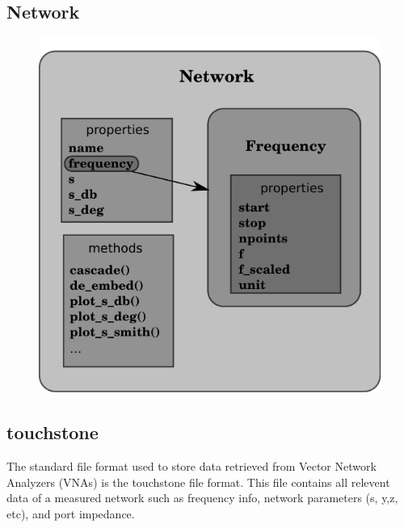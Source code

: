 \documentclass[letterpaper,10pt,english]{sphinxmanual}
\begin{document}
\subsection{Network}
\label{architecture:network}\begin{figure}[htbp]
\centering

\includegraphics{network.pdf}
\end{figure}


\subsection{touchstone}
\label{architecture:touchstone}
The standard file format used to store data retrieved from Vector Network Analyzers (VNAs) is the touchstone file format. This file contains all relevent data of a measured network such as frequency info, network parameters (s, y,z, etc), and port impedance.
\end{document}
